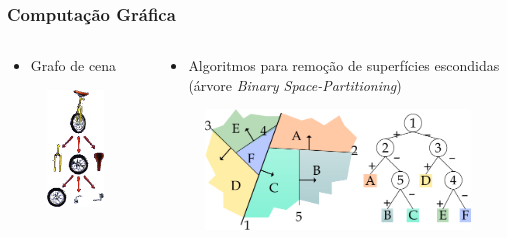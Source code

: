 \documentclass[aspectratio=169]{beamer}
\begin{document}
\begin{frame}\frametitle{Computação Gráfica}
\begin{columns}[T]
\begin{column}{0.30\linewidth}
\begin{itemize}
	\item Grafo de cena
\end{itemize}
\begin{figure}[h]
	\centering
	\includegraphics[height=0.60\paperheight]{imagens/grafo_de_cena.png}
\end{figure}
\end{column}
\begin{column}{0.70\linewidth}
\begin{itemize}
	\item Algoritmos para remoção de superfícies escondidas (árvore \emph{Binary Space-Partitioning})
\end{itemize}
\begin{figure}[h]
	\centering
	\includegraphics[height=0.50\paperheight]{imagens/binary_space_partitioning.png}
\end{figure}
\end{column}
\end{columns}
\end{frame}
\end{document}
